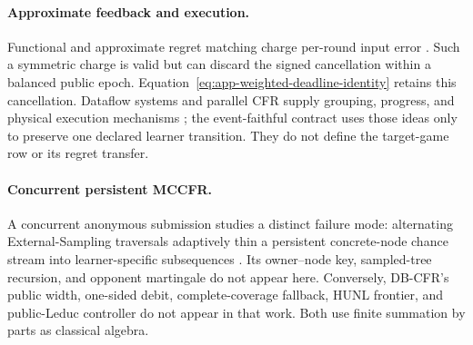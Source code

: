 \paragraph{Approximate feedback and execution.}
Functional and approximate regret matching charge per-round input error
\citep{waugh2015functional,dorazio2019approximate}.  Such a symmetric charge
is valid but can discard the signed cancellation within a balanced public
epoch.  Equation~\ref{eq:app-weighted-deadline-identity} retains this
cancellation.
Dataflow systems and parallel CFR supply grouping, progress, and physical
execution mechanisms \citep{akidau2015dataflow,murray2013naiad,kim2026parallel};
the event-faithful contract uses those ideas only to preserve one declared
learner transition.  They do not define the target-game row or its regret
transfer.

\paragraph{Concurrent persistent MCCFR.}
A concurrent anonymous submission studies a distinct failure mode:
alternating External-Sampling traversals adaptively thin a persistent
concrete-node chance stream into learner-specific subsequences
\citep{anonymous2027amccfr}.  Its owner--node key, sampled-tree recursion, and
opponent martingale do not appear here.  Conversely, DB-CFR's public width,
one-sided debit, complete-coverage fallback, HUNL frontier, and public-Leduc
controller do not appear in that work.  Both use finite summation by parts as
classical algebra.
